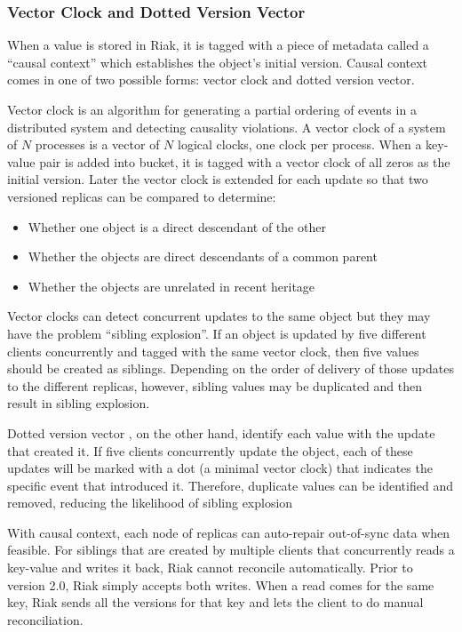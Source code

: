 \documentclass[12pt]{book}
\begin{document}
\subsubsection{Vector Clock and Dotted Version Vector}
When a value is stored in Riak, it is tagged with a piece of metadata called a ``causal context'' which establishes the object's initial version. Causal context comes in one of two possible forms: vector clock and dotted version vector.

Vector clock \cite{fidge1988timestamps, Mattern89virtualtime} is an algorithm for generating a partial ordering of events in a distributed system and detecting causality violations. A vector clock of a system of $N$ processes is a vector of $N$ logical clocks, one clock per process. When a key-value pair is added into bucket, it is tagged with a vector clock of all zeros as the initial version. Later the vector clock is extended for each update so that two versioned replicas can be compared to determine:
\begin{itemize}
\item Whether one object is a direct descendant of the other
\item Whether the objects are direct descendants of a common parent
\item Whether the objects are unrelated in recent heritage
\end{itemize}

Vector clocks can detect concurrent updates to the same object but they may have the problem ``sibling explosion''. If an object is updated by five different clients concurrently and tagged with the same vector clock, then five values should be created as siblings. Depending on the order of delivery of those updates to the different replicas, however, sibling values may be duplicated and then result in sibling explosion.

Dotted version vector \cite{Preguica:2012:BAE}, on the other hand, identify each value with the update that created it. If five clients concurrently update the object, each of these updates will be marked with a dot (a minimal vector clock) that indicates the specific event that introduced it. Therefore, duplicate values can be identified and removed, reducing the likelihood of sibling explosion

With causal context, each node of replicas can auto-repair out-of-sync data when feasible. For siblings that are created by multiple clients that concurrently reads a key-value and writes it back, Riak cannot reconcile automatically. Prior to version 2.0, Riak simply accepts both writes. When a read comes for the same key, Riak sends all the versions for that key and lets the client to do manual reconciliation.
\end{document}
